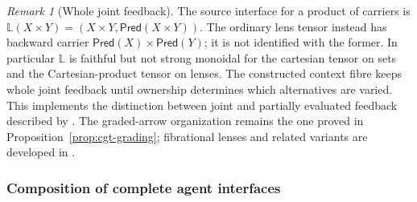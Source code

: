 \documentclass[11pt,a4paper]{article}
\numberwithin{equation}{section}
\theoremstyle{definition}
\theoremstyle{remark}
\newtheorem{remark}[theorem]{Remark}
\theoremstyle{plain}
\begin{document}
\begin{remark}[Whole joint feedback]
The source interface for a product of carriers is
$\mathbb L(X\times Y)=(X\times Y,\mathsf{Pred}(X\times Y))$.
The ordinary lens tensor instead has backward carrier
$\mathsf{Pred}(X)\times\mathsf{Pred}(Y)$; it is not identified with the
former. In particular $\mathbb L$ is faithful but not strong monoidal
for the cartesian tensor on sets and the Cartesian-product tensor on lenses.
The constructed context fibre keeps whole joint feedback until ownership
determines which alternatives are varied. This implements the distinction
between joint and partially evaluated feedback described by
\citet{Capucci2023}. The graded-arrow organization remains the one
proved in Proposition~\ref{prop:cgt-grading}; fibrational lenses and
related variants are developed in \citet[Section 6]{AtkeyEtAl2021}.
\end{remark}

\subsubsection{Composition of complete agent interfaces}
\end{document}

